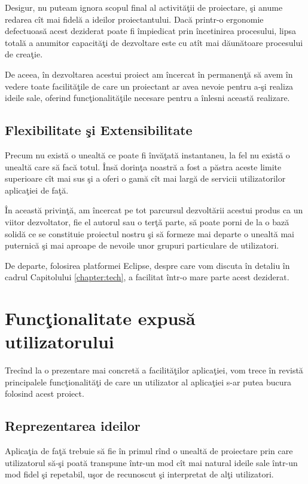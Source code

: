 Desigur, nu puteam ignora scopul final al activităţii de proiectare, şi anume
redarea cît mai fidelă a ideilor proiectantului. Dacă printr-o ergonomie
defectuoasă acest deziderat poate fi împiedicat prin încetinirea procesului, lipsa
totală a anumitor capacităţi de dezvoltare este cu atît mai dăunătoare
procesului de creaţie.

De aceea, în dezvoltarea acestui proiect am încercat în permanenţă să avem în
vedere toate facilităţile de care un proiectant ar avea nevoie pentru a-şi
realiza ideile sale, oferind funcţionalităţile necesare pentru a înlesni această
realizare.

\subsection{Flexibilitate şi Extensibilitate}

Precum nu există o unealtă ce poate fi învăţată instantaneu, la fel nu există o
unealtă care să facă totul. Însă dorinţa noastră a fost a păstra aceste limite
superioare cît mai sus şi a oferi o gamă cît mai largă de servicii
utilizatorilor aplicaţiei de faţă.

În această privinţă, am încercat pe tot parcursul dezvoltării acestui produs ca un
viitor dezvoltator, fie el autorul sau o terţă parte, să poate porni de la o
bază solidă ce se constituie proiectul nostru şi să formeze mai departe o
unealtă mai puternică şi mai aproape de nevoile unor grupuri particulare de
utilizatori.

De departe, folosirea platformei Eclipse, despre care vom discuta în detaliu în 
cadrul Capitolului \ref{chapter:tech}, a facilitat într-o mare parte acest 
deziderat.

\section{Funcţionalitate expusă utilizatorului}

Trecînd la o prezentare mai concretă a facilităţilor aplicaţiei, vom trece în
revistă principalele funcţionalităţi de care un utilizator al aplicaţiei s-ar
putea bucura folosind acest proiect.

\subsection{Reprezentarea ideilor}

Aplicaţia de faţă trebuie să fie în primul rînd o unealtă de proiectare prin
care utilizatorul să-şi poată transpune într-un mod cît mai natural ideile sale
într-un mod fidel şi repetabil, uşor de recunoscut şi interpretat de alţi
utilizatori.

